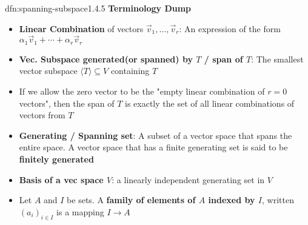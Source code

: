 \documentclass[landscape, 8pt]{extarticle}
\begin{document}
\begin{multicols}{3}
\begin{dfn}{dfn:spanning-subspace}{1.4.5}
    \textbf{Terminology Dump}
    \vspace{-3pt}
    \begin{itemize}
        \setlength\itemsep{0em}
        \item \textbf{Linear Combination} of vectors $\vec{v}_{1},\dots,\vec{v}_{r}$: An expression of the form $\alpha_{1}\vec{v}_{1}+\cdots+\alpha_{r}\vec{v}_{r}$
        \item \textbf{Vec. Subspace generated(or spanned) by $T$ / span of $T$}: The smallest vector subspace $\langle T \rangle \subseteq V$ containing $T$
        \item If we allow the zero vector to be the "empty linear combination of $r = 0$ vectors", then the span of $T$ is exactly the set of all linear combinations of vectors from $T$ 
        \item[\textbf{1.4.7}:] \textbf{Generating / Spanning set}: A subset of a vector space that spans the entire space. A vector space that has a finite generating set is said to be \textbf{finitely generated}
        \item[\textbf{1.5.8}:] \textbf{Basis of a vec space $V$}: a linearly independent generating set in $V$
        \item[\textbf{1.5.9}:] Let $A$ and $I$ be sets. A \textbf{family of elements of $A$ indexed by $I$}, written $(a_{i})_{i\in I}$ is a mapping $I\to A$
    \end{itemize}
    
\end{dfn}



\end{multicols}
\end{document}

